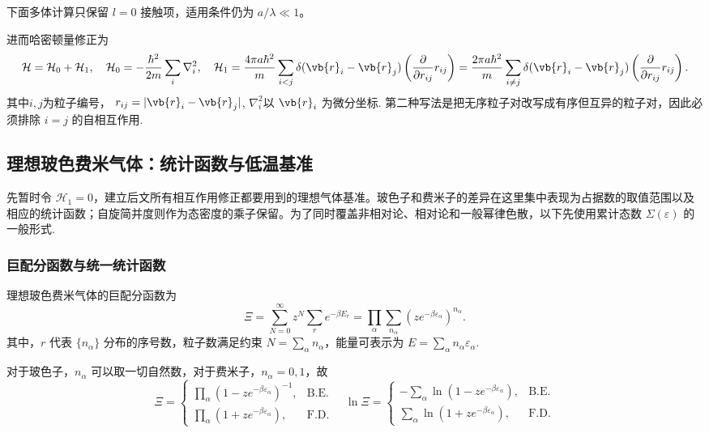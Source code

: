 下面多体计算只保留 \(l=0\) 接触项，适用条件仍为 \(a/\lambda\ll1\)。

进而哈密顿量修正为
\begin{equation*}
	\mathcal{H} = \mathcal{H}_{0} + \mathcal{H}_{1}, \quad \mathcal{H}_{0} = -\frac{\hbar^{2}}{2m} \sum_{i} \nabla_{i}^{2}, \quad \mathcal{H}_{1} = \frac{4\pi a \hbar^{2}}{m} \sum_{i<j} \delta(\vb{r}_{i} - \vb{r}_{j}) \left( \frac{\partial}{\partial r_{ij}} r_{ij} \right) = \frac{2\pi a \hbar^{2}}{m} \sum_{i\ne j} \delta(\vb{r}_{i} - \vb{r}_{j}) \left( \frac{\partial}{\partial r_{ij}} r_{ij} \right).
\end{equation*}
其中\(i, j\)为粒子编号， \(r_{ij} = |\vb{r}_{i} - \vb{r}_{j}|\), \(\nabla_{i}^{2}\)以 \(\vb{r}_{i}\) 为微分坐标. 第二种写法是把无序粒子对改写成有序但互异的粒子对，因此必须排除 \(i=j\) 的自相互作用.

\subsection{理想玻色费米气体：统计函数与低温基准}

先暂时令 \(\mathcal{H}_{1}=0\)，建立后文所有相互作用修正都要用到的理想气体基准。玻色子和费米子的差异在这里集中表现为占据数的取值范围以及相应的统计函数；自旋简并度则作为态密度的乘子保留。为了同时覆盖非相对论、相对论和一般幂律色散，以下先使用累计态数 \(\Sigma(\varepsilon)\) 的一般形式.

\subsubsection{巨配分函数与统一统计函数}

理想玻色费米气体的巨配分函数为
\begin{equation*}
	\Xi = \sum_{N=0}^{\infty} z^{N} \sum_{r} e^{-\beta E_{r}} = \prod_{\alpha} \sum_{n_{\alpha}} \left( z e^{-\beta \varepsilon_{\alpha}} \right)^{n_{\alpha}}.
\end{equation*}
其中，\(r\) 代表 \(\{n_{\alpha}\}\) 分布的序号数，粒子数满足约束 \(N = \sum_{\alpha} n_{\alpha}\)，能量可表示为 \(E = \sum_{\alpha} n_{\alpha} \varepsilon_{\alpha}\).

对于玻色子，\(n_{\alpha}\) 可以取一切自然数，对于费米子，\(n_{\alpha} = 0, 1\)，故
\begin{equation*}
	\Xi =
	\begin{cases}
		\prod_{\alpha} \left( 1 - z e^{-\beta \varepsilon_{\alpha}} \right)^{-1}, & \text{B.E.} \\
		\prod_{\alpha} \left( 1 + z e^{-\beta \varepsilon_{\alpha}} \right),      & \text{F.D.}
	\end{cases}
	\quad
	\ln \Xi =
	\begin{cases}
		-\sum_{\alpha} \ln \left( 1 - z e^{-\beta \varepsilon_{\alpha}} \right), & \text{B.E.} \\
		\sum_{\alpha} \ln \left( 1 + z e^{-\beta \varepsilon_{\alpha}} \right),  & \text{F.D.}
	\end{cases}
\end{equation*}

